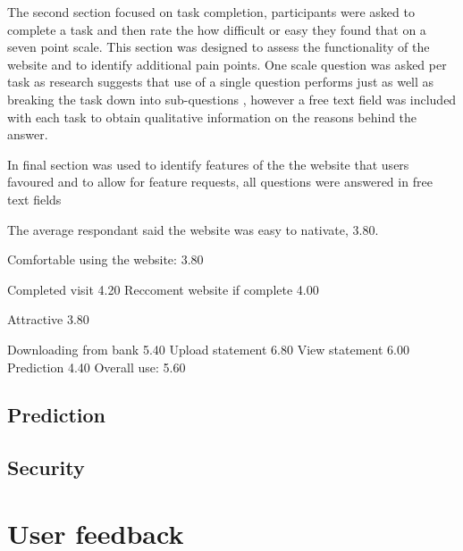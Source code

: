 The second section focused on task completion, participants were asked to complete a task and then rate the how difficult or easy they found that on a seven point scale.
%
This section was designed to assess the functionality of the website and to identify additional pain points.
%
One scale question was asked per task as research suggests that use of a single question performs just as well as breaking the task down into sub-questions \parencite{sauro2009comparison, sauro2009correlations}, however a free text field was included with each task to obtain qualitative information on the reasons behind the answer.

In final section was used to identify features of the the website that users favoured and to allow for feature requests, all questions were answered in free text fields

The average respondant said the website was easy to nativate, 3.80.

Comfortable using the website: 3.80

Completed visit 4.20
Reccoment website if complete 4.00

Attractive 3.80

Downloading from bank 5.40
Upload statement 6.80
View statement 6.00
Prediction 4.40
Overall use: 5.60

\subsection{Prediction}

\subsection{Security}




\section{User feedback}



